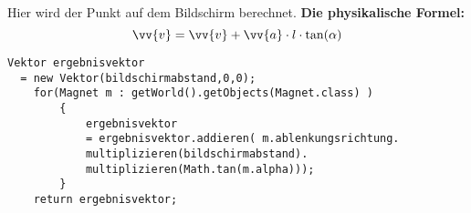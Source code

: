 Hier wird der Punkt auf dem Bildschirm berechnet.
\newline \textbf{Die physikalische Formel:}
$$ \vv{v} = \vv{v} + \vv{a} \cdot l \cdot \tan(\alpha)$$
\begin{lstlisting}
Vektor ergebnisvektor 
  = new Vektor(bildschirmabstand,0,0);
    for(Magnet m : getWorld().getObjects(Magnet.class) )
        {
            ergebnisvektor 
            = ergebnisvektor.addieren( m.ablenkungsrichtung.
            multiplizieren(bildschirmabstand).
            multiplizieren(Math.tan(m.alpha)));
        }
    return ergebnisvektor;
\end{lstlisting}
 
